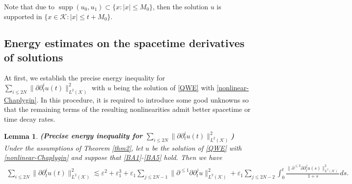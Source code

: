\documentclass[11pt,twoside]{article}
\def\cK{\mathcal K}
\def\ds{\displaystyle}
\def\supp{\mathop{\rm supp}\nolimits}
\def\p{\partial}
\def\ve{\varepsilon}
\def\supp{\operatorname{supp}}
\def\ls{\lesssim}
\theoremstyle{plain}
\newtheorem{lemma}[theorem]{Lemma}
\theoremstyle{definition}
\numberwithin{equation}{section}
\begin{document}
Note that due to $\supp(u_0,u_1)\subset\{x: |x|\le M_0\}$,
then the solution $u$ is supported in $\{x\in\cK:|x|\le t+M_0\}$.


\subsection{Energy estimates on the spacetime  derivatives of solutions}\label{Sonn-2}
At first, we establish the precise energy inequality for $\ds\sum_{i\le2N}\|\p\p_t^iu(t)\|^2_{L^2(\cK)}$
with $u$ being the solution of \eqref{QWE} with \eqref{nonlinear-Chaplygin}.
In this procedure, it is required to introduce some good unknowns so that the remaining
terms of the resulting nonlinearities admit better spacetime or time decay rates.

\begin{lemma}\label{lem:energy:time}
{\bf (Precise energy inequality for $\ds\sum_{i\le2N}\|\p\p_t^iu(t)\|^2_{L^2(\cK)}$)}
Under the assumptions of Theorem \ref{thm2}, let $u$ be the solution of \eqref{QWE} with \eqref{nonlinear-Chaplygin}
and suppose that \eqref{BA1}-\eqref{BA5} hold.
Then we have
\begin{equation}\label{energy:time}
\begin{split}
\sum_{i\le2N}\|\p\p_t^iu(t)\|^2_{L^2(\cK)}
\ls\ve^2+\ve_1^3+\ve_1\sum_{j\le2N-1}\|\p^{\le1}\p\p_t^ju\|^2_{L^2(\cK)}
+\ve_1\sum_{j\le2N-2}\int_0^t\frac{\|\p^{\le2}\p\p_t^ju(s)\|^2_{L^2(\cK)}}{1+s}ds.
\end{split}
\end{equation}
\end{lemma}
\end{document}
